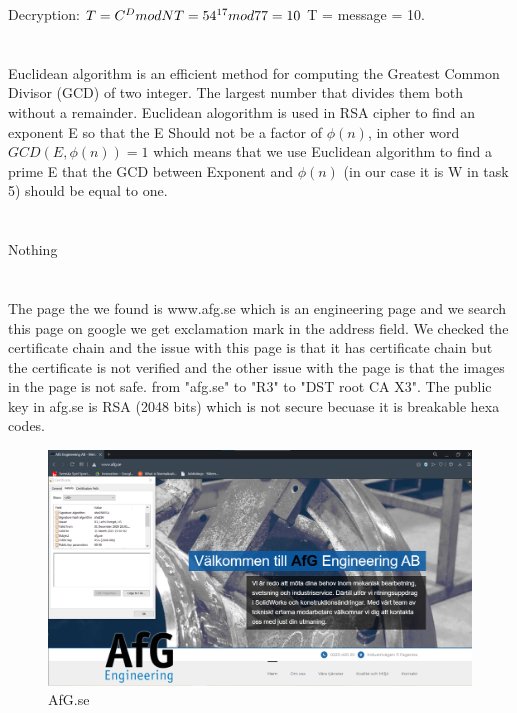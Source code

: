 \documentclass{article}
\begin{document}
            Decryption:\newline
        \begin{math}
            T = C ^ D mod N \newline 
            T = 54^{17} mod 77 = 10
        \end{math}\newline
        T = message = 10. 
    \section{}
    Euclidean algorithm is an efficient method for computing the Greatest Common Divisor (GCD) of two integer. The largest number that divides them both without a remainder.\newline
    Euclidean alogorithm is used in RSA cipher to find an exponent E so that the E Should not be a factor of $\phi(n)$, in other word $GCD(E,\phi(n)) = 1$ 
    which means that we use Euclidean algorithm to find a prime E that the GCD between Exponent and $\phi(n)$ (in our case it is W in task 5) should be equal to one.
    \section{}
    \section{}
    Nothing
    \section{}
    The page the we found is www.afg.se which is an engineering page and we search this page on google we
    get exclamation mark in the address field. We checked the certificate chain and the issue with this page is that it has certificate chain but the certificate is not verified and the other issue with the page is that the images in the page is not safe. from "afg.se" to "R3" to "DST root CA X3". 
    The public key in afg.se is RSA (2048 bits) which is not secure becuase it is breakable hexa codes.\cite{AFG}
    \begin{figure}
        \includegraphics[width=\linewidth]{afg.png}
        \caption{AfG.se}
        \label{fig:AfG}
    \end{figure}
        \newpage
        \printbibliography
\end{document}
